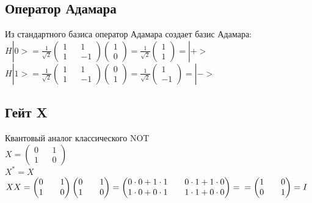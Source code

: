 \documentclass[11pt]{report}
\begin{document}
\subsection{Оператор Адамара}
Из стандартного базиса оператор Адамара создает базис Адамара: \\

$H|0>=\frac{1}{\sqrt2}\begin{pmatrix}
1 && 1 \\
1 && -1\end{pmatrix}
\begin{pmatrix}
1 \\
0\end{pmatrix}
= \frac{1}{\sqrt2}
\begin{pmatrix}
1 \\
1\end{pmatrix}
=|+>$ \\

$H|1>=\frac{1}{\sqrt2}\begin{pmatrix}
1 && 1 \\
1 && -1\end{pmatrix}
\begin{pmatrix}
0 \\
1\end{pmatrix}
= \frac{1}{\sqrt2}
\begin{pmatrix}
1 \\
-1\end{pmatrix}
=|->$ \\


\subsection{Гейт X}
Квантовый аналог классического NOT\\

$X=\begin{pmatrix}
0 && 1 \\
1 && 0\end{pmatrix}
$\\

$X^{*}=X$\\

$XX=\begin{pmatrix}
0 && 1 \\
1 && 0\end{pmatrix} 
\begin{pmatrix}
0 && 1 \\
1 && 0\end{pmatrix} 
=
\begin{pmatrix}
0\cdot0+1\cdot1 && 0\cdot 1 + 1 \cdot 0\\

1\cdot 0 + 0 \cdot 1 && 1\cdot 1 + 0 \cdot 0\end{pmatrix}= \\=
\begin{pmatrix}
1 && 0 \\
0 && 1\end{pmatrix}=I$
\end{document}
